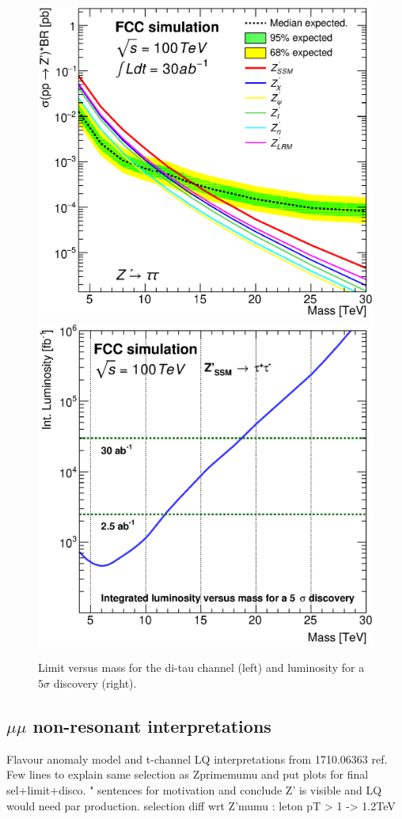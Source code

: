 \documentclass{cernrep}
\begin{document}
\begin{figure}[!htb]
  \centering
  \includegraphics[width=0.33\columnwidth]{Fig/lim_Zprime_tautau_fcc_v02_allxs.eps}
  \includegraphics[width=0.33\columnwidth]{Fig/DiscoveryPotential_tautau_rootStyle.eps}
  \caption{Limit versus mass for the di-tau channel (left) and luminosity for a $5\sigma$ discovery (right). }
  \label{figure:leptonicresonances:resultstautau}
\end{figure}


\subsection{\texorpdfstring{$\mu\mu$}{uu} non-resonant interpretations}
Flavour anomaly model and t-channel LQ interpretations from 1710.06363 ref. Few lines to explain same selection as Zprimemumu and put plots for final sel+limit+disco. " sentences for motivation and conclude Z' is visible and LQ would need par production.
selection diff wrt Z'mumu : leton pT > 1 -> 1.2TeV
\end{document}

